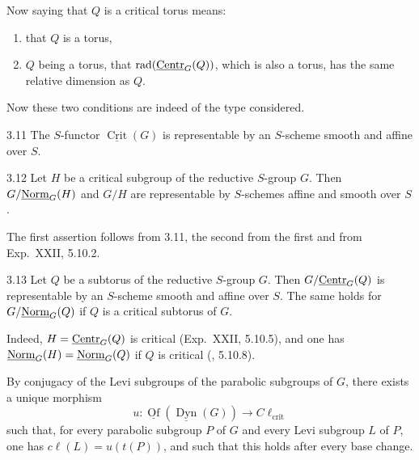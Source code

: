 Now saying that $Q$ is a critical torus means:
\begin{enumerate}[label=\textup{(\arabic*)}]
\item that $Q$ is a torus,
\item $Q$ being a torus, that $\operatorname{rad}(\underline{\mathrm{Centr}}_G(Q))$, which is also a torus, has the same relative dimension as $Q$.
\end{enumerate}
Now these two conditions are indeed of the type considered.
\begin{corollary}{3.11}\label{XXVI.3.11}
The $S$-functor $\underline{\operatorname{Crit}}(G)$ is representable by an $S$-scheme smooth and affine over $S$.
\end{corollary}
\begin{corollary}{3.12}\label{XXVI.3.12}
Let $H$ be a critical subgroup of the reductive $S$-group $G$. Then $G/\underline{\mathrm{Norm}}_G(H)$ and $G/H$ are representable by $S$-schemes affine and smooth over $S$.
\end{corollary}
The first assertion follows from 3.11, the second from the first and from Exp.~XXII, 5.10.2.
\begin{corollary}{3.13}\label{XXVI.3.13}
Let $Q$ be a subtorus of the reductive $S$-group $G$. Then $G/\underline{\mathrm{Centr}}_G(Q)$ is representable by an $S$-scheme smooth and affine over $S$. The same holds for $G/\underline{\mathrm{Norm}}_G(Q)$ if $Q$ is a critical subtorus of $G$.
\end{corollary}
Indeed, $H=\underline{\mathrm{Centr}}_G(Q)$ is critical (Exp.~XXII, 5.10.5), and one has $\underline{\mathrm{Norm}}_G(H)=\underline{\mathrm{Norm}}_G(Q)$ if $Q$ is critical (\loccit, 5.10.8).

\label{XXVI.3.14}
By conjugacy of the Levi subgroups of the parabolic subgroups of $G$, there exists a unique morphism
\[
u:\underline{\operatorname{Of}}(\underline{\operatorname{Dyn}}(G))\to C\ell_{\mathrm{crit}}
\]
such that, for every parabolic subgroup $P$ of $G$ and every Levi subgroup $L$ of $P$, one has $c\ell(L)=u(t(P))$, and such that this holds after every base change.


